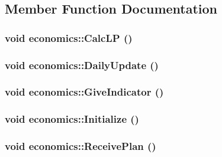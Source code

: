 \subsection{Member Function Documentation}
\hypertarget{classeconomics_ac2c642336d04e8c35ab352d3ae0b426b}{
\subsubsection[{CalcLP}]{\setlength{\rightskip}{0pt plus 5cm}void economics::CalcLP ()}}
\label{classeconomics_ac2c642336d04e8c35ab352d3ae0b426b}
\hypertarget{classeconomics_abdb59e181d8c9fab074c23f50ff84706}{
\subsubsection[{DailyUpdate}]{\setlength{\rightskip}{0pt plus 5cm}void economics::DailyUpdate ()}}
\label{classeconomics_abdb59e181d8c9fab074c23f50ff84706}
\hypertarget{classeconomics_ae447147d6d743ad7549ccd263444acad}{
\subsubsection[{GiveIndicator}]{\setlength{\rightskip}{0pt plus 5cm}void economics::GiveIndicator ()}}
\label{classeconomics_ae447147d6d743ad7549ccd263444acad}
\hypertarget{classeconomics_a9f6defdc19737bd99b069a7781d1ff49}{
\subsubsection[{Initialize}]{\setlength{\rightskip}{0pt plus 5cm}void economics::Initialize ()}}
\label{classeconomics_a9f6defdc19737bd99b069a7781d1ff49}
\hypertarget{classeconomics_a4b31c145e3818a3d4ee6502914e45fd8}{
\subsubsection[{ReceivePlan}]{\setlength{\rightskip}{0pt plus 5cm}void economics::ReceivePlan ()}}
\label{classeconomics_a4b31c145e3818a3d4ee6502914e45fd8}
